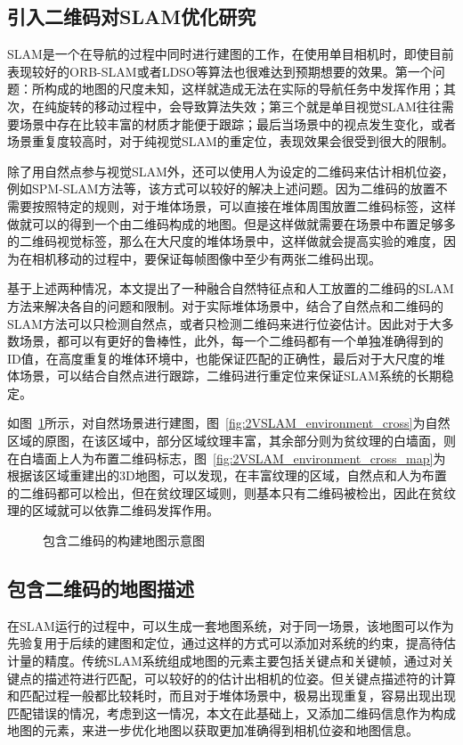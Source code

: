 \subsection{引入二维码对SLAM优化研究}
SLAM是一个在导航的过程中同时进行建图的工作，在使用单目相机时，即使目前表现较好的ORB-SLAM或者LDSO等算法也很难达到预期想要的效果。第一个问题：所构成的地图的尺度未知，这样就造成无法在实际的导航任务中发挥作用；其次，在纯旋转的移动过程中，会导致算法失效；第三个就是单目视觉SLAM往往需要场景中存在比较丰富的材质才能便于跟踪；最后当场景中的视点发生变化，或者场景重复度较高时，对于纯视觉SLAM的重定位，表现效果会很受到很大的限制。

除了用自然点参与视觉SLAM外，还可以使用人为设定的二维码来估计相机位姿，例如SPM-SLAM方法等，该方式可以较好的解决上述问题。因为二维码的放置不需要按照特定的规则，对于堆体场景，可以直接在堆体周围放置二维码标签，这样做就可以的得到一个由二维码构成的地图。但是这样做就需要在场景中布置足够多的二维码视觉标签，那么在大尺度的堆体场景中，这样做就会提高实验的难度，因为在相机移动的过程中，要保证每帧图像中至少有两张二维码出现。

基于上述两种情况，本文提出了一种融合自然特征点和人工放置的二维码的SLAM方法来解决各自的问题和限制。对于实际堆体场景中，结合了自然点和二维码的SLAM方法可以只检测自然点，或者只检测二维码来进行位姿估计。因此对于大多数场景，都可以有更好的鲁棒性，此外，每一个二维码都有一个单独准确得到的ID值，在高度重复的堆体环境中，也能保证匹配的正确性，最后对于大尺度的堆体场景，可以结合自然点进行跟踪，二维码进行重定位来保证SLAM系统的长期稳定。

如图~\ref{fig:2VSLAM_environment}所示，对自然场景进行建图，图~\ref{fig:2VSLAM_environment_cross}为自然区域的原图，在该区域中，部分区域纹理丰富，其余部分则为贫纹理的白墙面，则在白墙面上人为布置二维码标志，图~\ref{fig:2VSLAM_environment_cross_map}为根据该区域重建出的3D地图，可以发现，在丰富纹理的区域，自然点和人为布置的二维码都可以检出，但在贫纹理区域则，则基本只有二维码被检出，因此在贫纹理的区域就可以依靠二维码发挥作用。
\begin{figure}[h]
  \centering
  \vskip1.2cm
  \caption{包含二维码的构建地图示意图}
  \label{fig:2VSLAM_environment}
\end{figure}
\subsection{包含二维码的地图描述}
\label{sec:2.3.2}
在SLAM运行的过程中，可以生成一套地图系统，对于同一场景，该地图可以作为先验复用于后续的建图和定位，通过这样的方式可以添加对系统的约束，提高待估计量的精度。传统SLAM系统组成地图的元素主要包括关键点和关键帧，通过对关键点的描述符进行匹配，可以较好的的估计出相机的位姿。但关键点描述符的计算和匹配过程一般都比较耗时，而且对于堆体场景中，极易出现重复，容易出现出现匹配错误的情况，考虑到这一情况，本文在此基础上，又添加二维码信息作为构成地图的元素，来进一步优化地图以获取更加准确得到相机位姿和地图信息。

